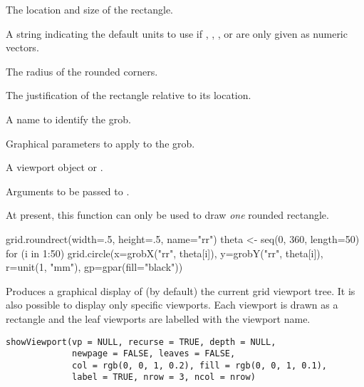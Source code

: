 %
\begin{Arguments}
\begin{ldescription}
\item[\code{x, y, width, height}] The location and size of the rectangle.
\item[\code{default.units}] A string indicating the default units to use
if , , , or 
are only given as numeric vectors. 
\item[\code{r}] The radius of the rounded corners.
\item[\code{just}] The justification of the rectangle relative to its
location.
\item[\code{name}] A name to identify the grob.
\item[\code{gp}] Graphical parameters to apply to the grob.
\item[\code{vp}] A viewport object or .
\item[\code{...}] Arguments to be passed to .
\end{ldescription}
\end{Arguments}
%
\begin{Details}\relax
At present, this function can only be used to draw \emph{one}
rounded rectangle.
\end{Details}
%
\begin{Examples}
\begin{ExampleCode}
grid.roundrect(width=.5, height=.5, name="rr")
theta <- seq(0, 360, length=50)
for (i in 1:50) 
    grid.circle(x=grobX("rr", theta[i]),
                y=grobY("rr", theta[i]),
                r=unit(1, "mm"),
                gp=gpar(fill="black"))
\end{ExampleCode}
\end{Examples}
%
\begin{Description}\relax
Produces a graphical display of (by default) the current
grid viewport tree.  It is also possible to display only
specific viewports.  Each viewport is drawn as a rectangle
and the leaf viewports are labelled with the viewport name.
\end{Description}
%
\begin{Usage}
\begin{verbatim}
showViewport(vp = NULL, recurse = TRUE, depth = NULL,
             newpage = FALSE, leaves = FALSE,
             col = rgb(0, 0, 1, 0.2), fill = rgb(0, 0, 1, 0.1),
             label = TRUE, nrow = 3, ncol = nrow)
\end{verbatim}
\end{Usage}

